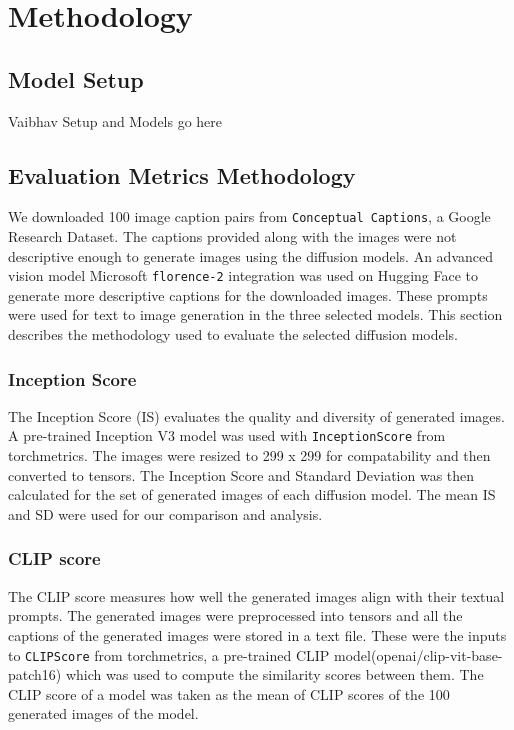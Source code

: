 \documentclass{article}
\begin{document}
\section{Methodology}
\subsection{Model Setup}
Vaibhav Setup and Models go here

\subsection{Evaluation Metrics Methodology}
We downloaded 100 image caption pairs from \texttt{Conceptual Captions}, a Google Research Dataset. 
The captions provided along with the images were not descriptive enough to generate images 
using the diffusion models. An advanced vision model Microsoft \texttt{florence-2} integration was used on Hugging Face 
to generate more descriptive captions for the downloaded images. These prompts were used for text to image generation 
in the three selected models. This section describes the methodology used to evaluate the selected diffusion models. 

\subsubsection{Inception Score}
The Inception Score (IS) evaluates the quality and diversity of generated images. A pre-trained Inception V3 model was used with 
\texttt{InceptionScore} from torchmetrics. The images were resized to 299 x 299 for compatability and then converted to tensors. The Inception Score
and Standard Deviation was then calculated for the set of generated images of each diffusion model. The mean IS and SD were used for our comparison and analysis.

\subsubsection{CLIP score}
The CLIP score measures how well the generated images align with their textual prompts. The generated images were 
preprocessed into tensors and all the captions of the generated images were stored in a text file. These were the inputs to \texttt{CLIPScore} from 
torchmetrics, a pre-trained CLIP model(openai/clip-vit-base-patch16) which was 
used to compute the similarity scores between them. The CLIP score of a model was taken as the mean of CLIP scores 
of the 100 generated images of the model. 
\end{document}
